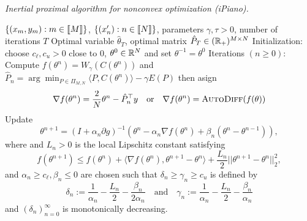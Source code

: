\begin{algorithm}[th!]
  \caption{\textit{Inertial  proximal  algorithm  for  nonconvex  optimization
      (iPiano).}  }
  \label{algo:iPiano}
  \begin{algorithmic}
    \REQUIRE    $\{(x_{m},     y_{m})    :    m    \in     \llbracket    M    \rrbracket\}$,
    $\{(x'_{n}) : n \in \llbracket N \rrbracket\}$, parameters $\gamma, \tau > 0$, number of
    iterations $T$ %
    \ENSURE    Optimal     variable    $\hat{\theta}_T$,     optimal    matrix
    $\hat{P}_T \in (\mathbb{R}_{+})^{M\times N}$ %
    \STATE   Initialization:  choose   $c_{\ell},  c_{u}   >0$  close   to  0,
    $\theta^0 \in \mathbb{R}^N$ and set $\theta^{-1} = \theta^{0}$ %
    \STATE          Iterations          $(n\geq          0)$:          Compute
    $f(\theta^n)         =        W_{\gamma}(         C(\theta^n))$        and
    $\hat{P}_n = \arg\min_{P  \in \Pi_{M,N}} \langle P,  C(\theta^n) \rangle -
    \gamma E(P)$ then asign
    \begin{equation*}
      \nabla    f(\theta^n)    =    \frac{2}{N}\theta^n    -
      \hat{P}_n^{\top}  y   \quad  \textrm{or}  \quad  \nabla   f(\theta^n)  =
      \textsc{AutoDiff}(f(\theta))
    \end{equation*}
    Update
    \begin{equation*}
      \theta^{n+1} = (I+ \alpha_n  \partial g) ^{-1} (\theta^{n} -
      \alpha_n \nabla f(\theta^n) + \beta_n (\theta^{n} - \theta^{n-1})),
    \end{equation*}
    where and $L_n>0$ is the local Lipschitz constant satisfying
    \begin{equation*}
      f(\theta^{n+1})   \leq   f(\theta^n)  +   \langle   \nabla
      f(\theta^n),  \theta^{n+1}  -\theta^n  \rangle  +  \frac{L_n}{2}||\theta^{n+1}
      -\theta^{n}||^2_2,
    \end{equation*}
    and  $\alpha_n  \geq  c_{\ell},  \beta_n  \leq 0$  are  chosen  such  that
    $\delta_n \geq \gamma_n \geq c_{u}$ is defined by
    \begin{equation*}
      \delta_n  :=   \frac{1}{\alpha_n}  -   \frac{L_n}{2}  -
      \frac{\beta_n}{2\alpha_n}   \quad   \textrm{and}   \quad   \gamma_n   :=
      \frac{1}{\alpha_n} - \frac{L_n}{2} - \frac{\beta_n}{\alpha_n}
    \end{equation*}
    and $(\delta_n)_{n=0}^{\infty}$ is monotonically decreasing.
  \end{algorithmic}
\end{algorithm}

